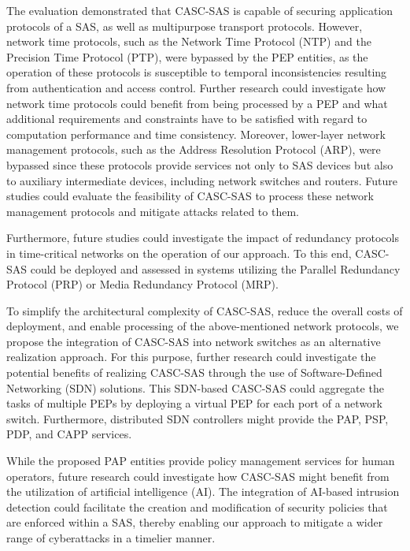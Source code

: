 The evaluation demonstrated that CASC-SAS is capable of securing application protocols of a SAS, as well as multipurpose transport protocols.
However, network time protocols, such as the Network Time Protocol (NTP) and the Precision Time Protocol (PTP), were bypassed by the PEP entities, as the operation of these protocols is susceptible to temporal inconsistencies resulting from authentication and access control.
Further research could investigate how network time protocols could benefit from being processed by a PEP and what additional requirements and constraints have to be satisfied with regard to computation performance and time consistency.
Moreover, lower-layer network management protocols, such as the Address Resolution Protocol (ARP), were bypassed since these protocols provide services not only to SAS devices but also to auxiliary intermediate devices, including network switches and routers.
Future studies could evaluate the feasibility of CASC-SAS to process these network management protocols and mitigate attacks related to them.

Furthermore, future studies could investigate the impact of redundancy protocols in time-critical networks on the operation of our approach.
To this end, CASC-SAS could be deployed and assessed in systems utilizing the Parallel Redundancy Protocol (PRP) or Media Redundancy Protocol (MRP).

To simplify the architectural complexity of CASC-SAS, reduce the overall costs of deployment, and enable processing of the above-mentioned network protocols, we propose the integration of CASC-SAS into network switches as an alternative realization approach.
For this purpose, further research could investigate the potential benefits of realizing CASC-SAS through the use of Software-Defined Networking (SDN) solutions.
This SDN-based CASC-SAS could aggregate the tasks of multiple PEPs by deploying a virtual PEP for each port of a network switch.
Furthermore, distributed SDN controllers might provide the PAP, PSP, PDP, and CAPP services.

While the proposed PAP entities provide policy management services for human operators, future research could investigate how CASC-SAS might benefit from the utilization of artificial intelligence (AI).
The integration of AI-based intrusion detection could facilitate the creation and modification of security policies that are enforced within a SAS, thereby enabling our approach to mitigate a wider range of cyberattacks in a timelier manner.

